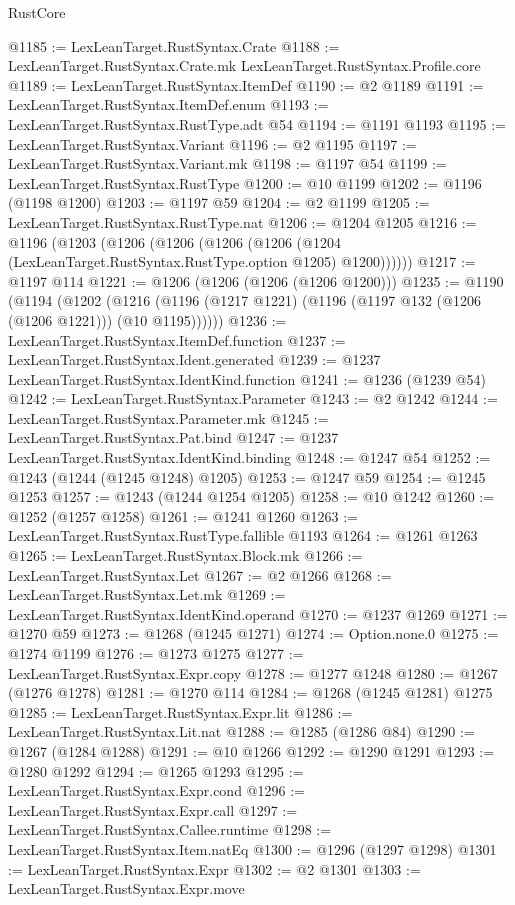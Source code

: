 \begin{lexlean}{RustCore}
\begin{coremodule}
@1185 := LexLeanTarget.RustSyntax.Crate
@1188 := LexLeanTarget.RustSyntax.Crate.mk LexLeanTarget.RustSyntax.Profile.core
@1189 := LexLeanTarget.RustSyntax.ItemDef
@1190 := @2 @1189
@1191 := LexLeanTarget.RustSyntax.ItemDef.enum
@1193 := LexLeanTarget.RustSyntax.RustType.adt @54
@1194 := @1191 @1193
@1195 := LexLeanTarget.RustSyntax.Variant
@1196 := @2 @1195
@1197 := LexLeanTarget.RustSyntax.Variant.mk
@1198 := @1197 @54
@1199 := LexLeanTarget.RustSyntax.RustType
@1200 := @10 @1199
@1202 := @1196 (@1198 @1200)
@1203 := @1197 @59
@1204 := @2 @1199
@1205 := LexLeanTarget.RustSyntax.RustType.nat
@1206 := @1204 @1205
@1216 := @1196
    (@1203
      (@1206
        (@1206 (@1206 (@1206 (@1204 (LexLeanTarget.RustSyntax.RustType.option @1205) @1200))))))
@1217 := @1197 @114
@1221 := @1206 (@1206 (@1206 (@1206 @1200)))
@1235 := @1190
    (@1194
      (@1202 (@1216 (@1196 (@1217 @1221) (@1196 (@1197 @132 (@1206 (@1206 @1221))) (@10 @1195))))))
@1236 := LexLeanTarget.RustSyntax.ItemDef.function
@1237 := LexLeanTarget.RustSyntax.Ident.generated
@1239 := @1237 LexLeanTarget.RustSyntax.IdentKind.function
@1241 := @1236 (@1239 @54)
@1242 := LexLeanTarget.RustSyntax.Parameter
@1243 := @2 @1242
@1244 := LexLeanTarget.RustSyntax.Parameter.mk
@1245 := LexLeanTarget.RustSyntax.Pat.bind
@1247 := @1237 LexLeanTarget.RustSyntax.IdentKind.binding
@1248 := @1247 @54
@1252 := @1243 (@1244 (@1245 @1248) @1205)
@1253 := @1247 @59
@1254 := @1245 @1253
@1257 := @1243 (@1244 @1254 @1205)
@1258 := @10 @1242
@1260 := @1252 (@1257 @1258)
@1261 := @1241 @1260
@1263 := LexLeanTarget.RustSyntax.RustType.fallible @1193
@1264 := @1261 @1263
@1265 := LexLeanTarget.RustSyntax.Block.mk
@1266 := LexLeanTarget.RustSyntax.Let
@1267 := @2 @1266
@1268 := LexLeanTarget.RustSyntax.Let.mk
@1269 := LexLeanTarget.RustSyntax.IdentKind.operand
@1270 := @1237 @1269
@1271 := @1270 @59
@1273 := @1268 (@1245 @1271)
@1274 := Option.none.{0}
@1275 := @1274 @1199
@1276 := @1273 @1275
@1277 := LexLeanTarget.RustSyntax.Expr.copy
@1278 := @1277 @1248
@1280 := @1267 (@1276 @1278)
@1281 := @1270 @114
@1284 := @1268 (@1245 @1281) @1275
@1285 := LexLeanTarget.RustSyntax.Expr.lit
@1286 := LexLeanTarget.RustSyntax.Lit.nat
@1288 := @1285 (@1286 @84)
@1290 := @1267 (@1284 @1288)
@1291 := @10 @1266
@1292 := @1290 @1291
@1293 := @1280 @1292
@1294 := @1265 @1293
@1295 := LexLeanTarget.RustSyntax.Expr.cond
@1296 := LexLeanTarget.RustSyntax.Expr.call
@1297 := LexLeanTarget.RustSyntax.Callee.runtime
@1298 := LexLeanTarget.RustSyntax.Item.natEq
@1300 := @1296 (@1297 @1298)
@1301 := LexLeanTarget.RustSyntax.Expr
@1302 := @2 @1301
@1303 := LexLeanTarget.RustSyntax.Expr.move

\end{coremodule}
\end{lexlean}
